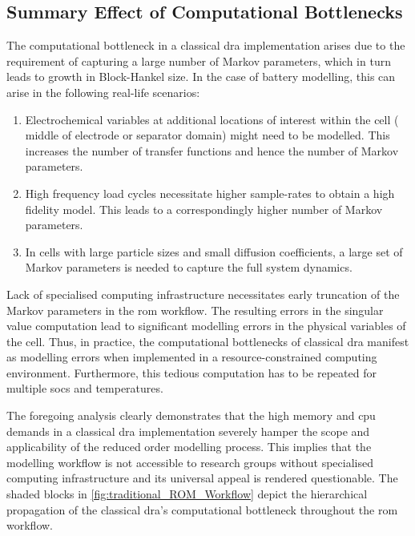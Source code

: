 \subsection{Summary Effect of Computational Bottlenecks}\label{subsec:Summary-Effect-of}

The computational bottleneck in a  classical \gls{dra} implementation arises due
to the  requirement of capturing a  large number of Markov  parameters, which in
turn leads  to growth in  Block-Hankel size. In  the case of  battery modelling,
this can arise in the following real-life scenarios:
\begin{enumerate}
	\item
        Electrochemical variables at additional locations of interest within the
        cell (\eg{}  middle of electrode or  separator domain) might need  to be
        modelled. This increases the number  of transfer functions and hence the
        number of Markov parameters.
	\item
        High frequency load  cycles necessitate higher sample-rates  to obtain a
        high fidelity  model. This leads  to a correspondingly higher  number of
        Markov parameters.
	\item
        In cells with  large particle sizes and small  diffusion coefficients, a
        large set  of Markov  parameters is  needed to  capture the  full system
        dynamics.
\end{enumerate}
Lack  of  specialised  computing infrastructure  necessitates  early  truncation
of  the  Markov parameters  in  the  \gls{rom}  workflow. The  resulting  errors
in  the singular  value  computation  lead to  significant  modelling errors  in
the  physical  variables of  the  cell.  Thus,  in practice,  the  computational
bottlenecks of classical \gls{dra} manifest as modelling errors when implemented
in  a  resource-constrained  computing environment.  Furthermore,  this  tedious
computation has to be repeated for multiple \glspl{soc} and temperatures.

The foregoing analysis  clearly demonstrates that the high  memory and \gls{cpu}
demands in  a classical \gls{dra}  implementation severely hamper the  scope and
applicability  of the  reduced order  modelling process.  This implies  that the
modelling  workflow is  not accessible  to research  groups without  specialised
computing infrastructure and its universal  appeal is rendered questionable. The
shaded  blocks in  \cref{fig:traditional_ROM_Workflow}  depict the  hierarchical
propagation of the classical \gls{dra}'s computational bottleneck throughout the
\gls{rom} workflow.

